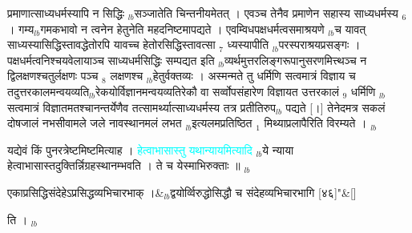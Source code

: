 \documentclass[article,12pt,a4paper]{memoir}%
\newcommand{\quotelemma}[1]{\textcolor{cyan}{#1}}
\newcounter{parCount}
\begin{document}
प्रमाणात्साध्यधर्मस्यापि न सिद्धिः {\tiny $_{lb}$}सञ्जातेति चिन्तनीयमेतत् । एवञ्च तेनैव प्रमाणेन सहास्य साध्यधर्मस्य {\tiny $_{6}$} । गम्य{\tiny $_{lb}$}गमकभावो न त्वनेन हेतुनेति महदनिष्टमापद्यते । एवम्विधपक्षधर्मत्वसमाश्रयणे {\tiny $_{lb}$}च यावत् साध्यस्यासिद्धिस्तावद्धेतोरपि यावच्च हेतोरसिद्धिस्तावत्सा {\tiny $_{7}$} ध्यस्यापीति {\tiny $_{lb}$}परस्पराश्रयप्रसङ्गः । पक्षधर्मत्वनिश्चयवेलायाञ्च साध्यधर्मसिद्धिः सम्पद्यत इति {\tiny $_{lb}$}व्यर्थमुत्तरलिङ्गरूपानुसरणमित्त्थञ्च न द्विलक्षणश्चतुर्लक्षणः पञ्च {\tiny $_{8}$} लक्षणश्च {\tiny $_{lb}$}हेतुर्वक्तव्यः । अस्मन्मते तु धर्मिणि सत्वमात्रं विज्ञाय च तदुत्तरकालमन्वयव्यति{\tiny $_{lb}$}रेकयोर्विज्ञानमन्वयव्यतिरेकौ वा सर्व्वोपसंहारेण विज्ञायत उत्तरकालं {\tiny $_{9}$} \leavevmode{} धर्मिणि {\tiny $_{lb}$}सत्वमात्रं विज्ञातमतश्चानन्तर्येणैव तत्सामर्थ्यात्साध्यधर्मस्य तत्र प्रतीतिरुप{\tiny $_{lb}$} \leavevmode{} पद्यते [।] तेनेदमत्र सकलं दोषजालं नभसीवामले जले नावस्थानमलं लभत {\tiny $_{lb}$}इत्यलमप्रतिष्ठित {\tiny $_{1}$} मिथ्याप्रलापैरिति विरम्यते ।
	{}
	\pend%
      {\tiny $_{lb}$}

	  
	  \pstart \leavevmode%
	\hphantom{.}यद्येवं किं पुनरत्रेष्टमिष्टमित्याह । \quotelemma{हेत्वाभासास्तु यथान्यायमित्यादि} \cite[2a7]{vn-msN} {\tiny $_{lb}$}ये न्याया हेत्वाभासास्तदुक्तिर्न्निग्रहस्थानम्भवति । ते च येस्माभिरुक्ताः ॥ {\tiny $_{lb}$} 
	    \pend%
	  
	    
	    \stanza[\smallbreak]
	  एकाप्रसिद्धिसंदेहेऽप्रसिद्धव्यभिचारभाक् ।&{\tiny $_{lb}$}द्वयोर्व्विरुद्धोसिद्धौ च संदेहव्यभिचारभागि [४६]{\normalfontlatin\large\qquad{}"}\&[\smallbreak]
	  
	  
	  
	    \pstart  \leavevmode%
	    \hphantom{.}
	   ति ।
	{}
	\pend%
      {\tiny $_{lb}$}
\end{document}
